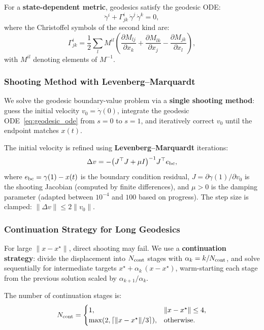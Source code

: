 \documentclass[11pt,a4paper]{article}
\begin{document}
For a \textbf{state-dependent metric}, geodesics satisfy the geodesic ODE:
\begin{equation}
\ddot\gamma^i + \Gamma^i_{jk}\,\dot\gamma^j\,\dot\gamma^k = 0,
\label{eq:geodesic_ode}
\end{equation}
where the Christoffel symbols of the second kind are:
\begin{equation}
\Gamma^i_{jk} = \frac{1}{2}\sum_l M^{il}\!\left(\frac{\partial M_{lj}}{\partial x_k} + \frac{\partial M_{lk}}{\partial x_j} - \frac{\partial M_{jk}}{\partial x_l}\right),
\label{eq:christoffel}
\end{equation}
with \(M^{il}\) denoting elements of \(M^{-1}\).

\subsubsection{Shooting Method with Levenberg--Marquardt}

We solve the geodesic boundary-value problem via a \textbf{single shooting method}: guess the initial velocity \(v_0 = \dot\gamma(0)\), integrate the geodesic ODE~\eqref{eq:geodesic_ode} from \(s = 0\) to \(s = 1\), and iteratively correct \(v_0\) until the endpoint matches \(x(t)\).

The initial velocity is refined using \textbf{Levenberg--Marquardt} iterations:
\[
\Delta v = -\bigl(J^\top J + \mu I\bigr)^{-1} J^\top e_{\rm bc},
\]
where \(e_{\rm bc} = \gamma(1) - x(t)\) is the boundary condition residual, \(J = \partial\gamma(1)/\partial v_0\) is the shooting Jacobian (computed by finite differences), and \(\mu > 0\) is the damping parameter (adapted between \(10^{-4}\) and \(100\) based on progress). The step size is clamped: \(\|\Delta v\| \le 2\|v_0\|\).

\subsubsection{Continuation Strategy for Long Geodesics}

For large \(\|x - x^\star\|\), direct shooting may fail. We use a \textbf{continuation strategy}: divide the displacement into \(N_{\rm cont}\) stages with \(\alpha_k = k/N_{\rm cont}\), and solve sequentially for intermediate targets \(x^\star + \alpha_k\,(x - x^\star)\), warm-starting each stage from the previous solution scaled by \(\alpha_{k+1}/\alpha_k\).

The number of continuation stages is:
\[
N_{\rm cont} = \begin{cases} 1, & \|x - x^\star\| \le 4, \\ \max(2, \lceil \|x - x^\star\| / 3 \rceil), & \text{otherwise.} \end{cases}
\]
\end{document}
